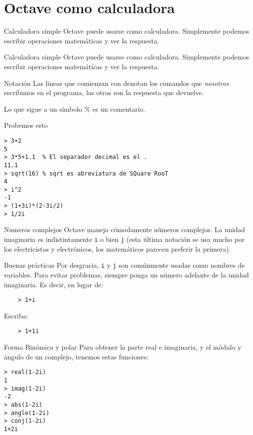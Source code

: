 \section{Octave como calculadora}


\begin{frame}{Calculadora simple}
	Octave puede usarse como calculadora. Simplemente podemos escribir operaciones matemáticas y ver la respuesta.
\end{frame}

\begin{frame}{Calculadora simple}
  Octave puede usarse como calculadora. Simplemente podemos escribir operaciones matemáticas y ver la respuesta.
{
  \begin{alertblock}{Notación}
    Las lineas que comienzan con  denotan los comandos que \emph{nosotros} escribimos en el programa, las otras son la respuesta que devuelve.
    
    Lo que sigue a un símbolo \% es un comentario.
  \end{alertblock}
}
\end{frame}

\begin{frame}[fragile]{Probemos esto} %
\begin{lstlisting}
> 3+2
5
> 3*5+1.1  % El separador decimal es el .
11.1
> sqrt(16) % sqrt es abreviatura de SQuare RooT
4
> i^2
-1
> (1+3i)*(2-3i/2)
> 1/2i
\end{lstlisting}
\end{frame}

\begin{frame}[fragile]{Numeros complejos}
  Octave maneja cómodamente números complejos. La unidad imaginaria es indistintamente \verb!i! o bien \verb!j! (esta última notación se usa mucho por los electricistas y electrónicos, los matemáticos parecen preferir la primera).

  \begin{alertblock}{Buenas prácticas}
    Por desgracia, \verb!i! y \verb!j! son comúnmente usadas como nombres de variables. Para evitar problemas, siempre ponga un número adelante de la unidad imaginaria.
    Es decir, en lugar de:
    \begin{verbatim}    > 1+i\end{verbatim}
    
    Escriba:
    \begin{verbatim}    > 1+1i\end{verbatim}
  \end{alertblock}

\end{frame}
\begin{frame}[fragile]{Forma Binómica y polar} %
Para obtener la parte real e imaginaria, y el módulo y ángulo de un complejo, tenemos estas funciones:
\begin{lstlisting}
> real(1-2i)
1
> imag(1-2i)
-2
> abs(1-2i)
> angle(1-2i)
> conj(1-2i)
1+2i
\end{lstlisting}
\end{frame}


